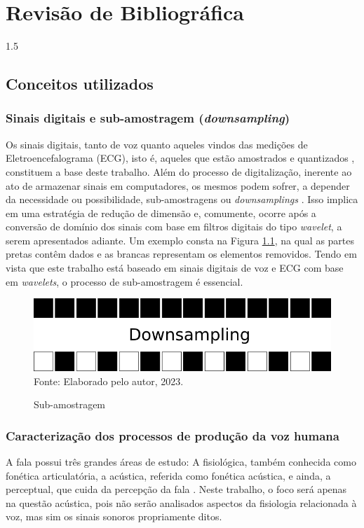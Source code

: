 \documentclass[a4paper,12pt,openright,oneside]{book}
\newenvironment{myenv}[1]
  {\begin{spacing}{#1}}
  {\end{spacing}}
\begin{document}
	\chapter{Revisão de Bibliográfica}
		\begin{myenv}{1.5}
			\section{Conceitos utilizados}
				\label{ch:revisao}
				\subsection{Sinais digitais e sub-amostragem (\textit{downsampling})}
					\par Os sinais digitais, tanto de voz quanto aqueles vindos das medições de Eletroencefalograma (ECG), isto é, aqueles que estão amostrados e quantizados \cite{haykin2011sistemas}, constituem a base deste trabalho. Além do processo de digitalização, inerente ao ato de armazenar sinais em computadores, os mesmos podem sofrer, a depender da necessidade ou possibilidade, sub-amostragens ou \textit{downsamplings} \cite{robi2003}. Isso implica em uma estratégia de redução de dimensão e, comumente, ocorre após a conversão de domínio dos sinais com base em filtros digitais do tipo \textit{wavelet}, a serem apresentados adiante. Um exemplo consta na Figura \ref{fig:downsampling}, na qual as partes pretas contêm dados e as brancas representam os elementos removidos. Tendo em vista que este trabalho está baseado em sinais digitais de voz e ECG com base em \textit{wavelets}, o processo de sub-amostragem é essencial. 
					\begin{figure}[h]
						\centering
						\caption{Sub-amostragem}
						\includegraphics[width=0.4\linewidth]{images/downsampling}
						\label{fig:downsampling}
						\\Fonte: Elaborado pelo autor, 2023.
					\end{figure}
				
			\subsection{Caracterização dos processos de produção da voz humana}
				\par A fala possui três grandes áreas de estudo: A fisiológica, também conhecida como fonética articulatória, a acústica, referida como fonética acústica, e ainda, a perceptual, que cuida da percepção  da  fala \cite{kremer2014eficiencia}. Neste trabalho, o foco será apenas na questão acústica, pois não serão analisados aspectos da fisiologia relacionada à voz, mas sim os sinais sonoros propriamente ditos.
				

\end{myenv}
\end{document}
